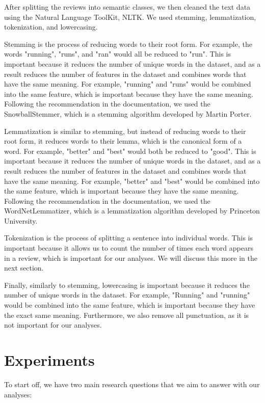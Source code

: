 \documentclass[12pt]{article}    %
\begin{document}
After splitting the reviews into semantic classes, we then cleaned the text data using the Natural Language ToolKit, NLTK. We used stemming, lemmatization, tokenization, and lowercasing. 

Stemming is the process of reducing words to their root form. For example, the words "running", "runs", and "ran" would all be reduced to "run". This is important because it reduces the number of unique words in the dataset, and as a result reduces the number of features in the dataset and combines words that have the same meaning. For example, "running" and "runs" would be combined into the same feature, which is important because they have the same meaning. Following the recommendation in the documentation, we used the SnowballStemmer, which is a stemming algorithm developed by Martin Porter.

Lemmatization is similar to stemming, but instead of reducing words to their root form, it reduces words to their lemma, which is the canonical form of a word. For example, "better" and "best" would both be reduced to "good". This is important because it reduces the number of unique words in the dataset, and as a result reduces the number of features in the dataset and combines words that have the same meaning. For example, "better" and "best" would be combined into the same feature, which is important because they have the same meaning. Following the recommendation in the documentation, we used the WordNetLemmatizer, which is a lemmatization algorithm developed by Princeton University.


Tokenization is the process of splitting a sentence into individual words. This is important because it allows us to count the number of times each word appears in a review, which is important for our analyses. We will discuss this more in the next section.

Finally, similarly to stemming, lowercasing is important because it reduces the number of unique words in the dataset. For example, "Running" and "running" would be combined into the same feature, which is important because they have the exact same meaning. Furthermore, we also remove all punctuation, as it is not important for our analyses.

\section{Experiments}

To start off, we have two main research questions that we aim to answer with our analyses:
\end{document}
